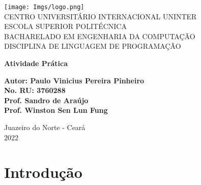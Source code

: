 \documentclass[
	12pt,				%
	openright,			%
	oneside,			%
	a4paper,			%
	chapter=TITLE,		%
	section=TITLE,		%
	english,			%
	french,				%
	spanish,			%
	brazil				%
	]{abntex2}
\begin{document}
\frenchspacing 

\begin{capa}
	\begin{center}
		\ABNTEXchapterfont\large{
			\texttt{[image: Imgs/logo.png]}\\
			CENTRO UNIVERSITÁRIO INTERNACIONAL UNINTER\\
			ESCOLA SUPERIOR POLITÉCNICA\\
			BACHARELADO EM ENGENHARIA DA COMPUTAÇÃO\\
			DISCIPLINA DE LINGUAGEM DE PROGRAMAÇÃO
		}
		\vfill

		\ABNTEXchapterfont\bfseries\LARGE{
			Atividade Prática
		}
	
		\vspace*{2cm}

		\begin{flushright}
			\ABNTEXchapterfont\bfseries\normalsize{
				Autor: Paulo Vinicius Pereira Pinheiro\\
				No. RU: 3760288\\
				Prof. Sandro de Araújo\\
				Prof. Winston Sen Lun Fung
			}
		\end{flushright}
		
		\vfill

		\ABNTEXchapterfont\normalsize{
			Juazeiro do Norte - Ceará\\
			2022			
		}
	\end{center}
\end{capa}


\listoffigures*
\cleardoublepage

\lstlistoflistings
\pagebreak


\tableofcontents*



\textual
\chapter*[INTRODUÇÃO]{\bfseries{Introdução}}
\end{document}
